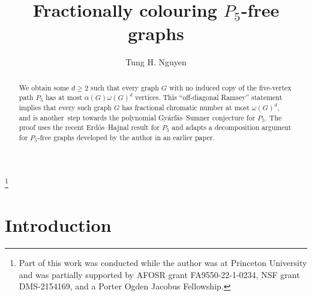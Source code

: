 \documentclass[11pt,reqno]{amsart}
\newcommand{\dd}{\textquotedblleft}
\newcommand{\ee}{\textquotedblright}
\newcommand{\erh}{Erd\H{o}s--Hajnal}
\newcommand{\gas}{Gy\'{a}rf\'{a}s--Sumner}
\begin{document}
	\title{Fractionally colouring $P_5$-free graphs}
	\author{Tung H. Nguyen}
	\address{Mathematical Institute and Christ Church, University of Oxford, Oxford, UK}
	\thanks{Part of this work was conducted while the author was at Princeton University and was partially supported by AFOSR grant FA9550-22-1-0234, NSF grant DMS-2154169,
		and a Porter Ogden Jacobus Fellowship.}
	\begin{abstract}
		We obtain some $d\ge2$ such that every graph $G$ with no induced copy of the five-vertex path $P_5$ has at most $\alpha(G)\omega(G)^d$ vertices.
		This \dd off-diagonal Ramsey\ee{} statement implies that every such graph $G$ has fractional chromatic number at most $\omega(G)^d$, and is another~step towards the polynomial \gas{} conjecture for $P_5$.
		The proof uses the recent \erh{} result for $P_5$ and adapts a decomposition argument for $P_5$-free graphs developed by the author in an earlier paper.
		
	\end{abstract}
	\maketitle
	\section{Introduction}
\end{document}
